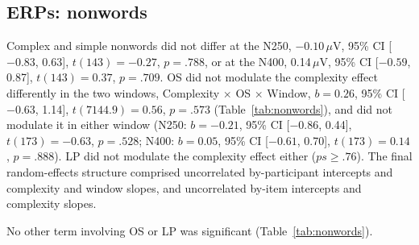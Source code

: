 \subsection{ERPs: nonwords}
Complex and simple nonwords did not differ at the N250, $-0.10$\,$\mu$V, 95\% CI
[$-0.83$, 0.63], $t(143) = -0.27$, $p = .788$, or at the N400, 0.14\,$\mu$V, 95\%
CI [$-0.59$, 0.87], $t(143) = 0.37$, $p = .709$. OS did not modulate the
complexity effect differently in the two windows, Complexity $\times$ OS $\times$
Window, $b = 0.26$, 95\% CI [$-0.63$, 1.14], $t(7144.9) = 0.56$, $p = .573$
(Table~\ref{tab:nonwords}), and did not modulate it in either window (N250:
$b = -0.21$, 95\% CI [$-0.86$, 0.44], $t(173) = -0.63$, $p = .528$; N400:
$b = 0.05$, 95\% CI [$-0.61$, 0.70], $t(173) = 0.14$, $p = .888$). LP did not
modulate the complexity effect either ($ps \geq .76$). The final random-effects
structure comprised uncorrelated by-participant intercepts and complexity and
window slopes, and uncorrelated by-item intercepts and complexity slopes.

No other term involving OS or LP was significant (Table~\ref{tab:nonwords}).


